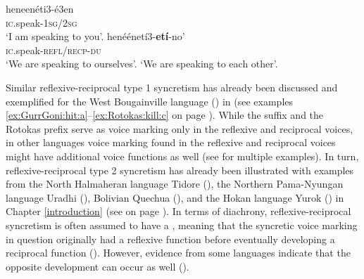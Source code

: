 \ea {} \citep[110, 140]{cowell:moss:2008}
\ea\label{ex:Arapaho:speak:a}
	\gll	heneenéti3-é3en	\\
			\textsc{ic}.speak-\textsc{1sg/2sg} \\
	\glt	‘I am speaking to you’.
\ex\label{ex:Arapaho:speak:b}
	\gll	henéénetí3-\textbf{etí}-no’ \\
			\textsc{ic}.speak-\textsc{refl/recp-du} \\
	\glt	‘We are speaking to ourselves’.
	\glt	‘We are speaking to each other’.
	\z 
\z

Similar reflexive-reciprocal type 1 syncretism has already been discussed and exemplified for the West Bougainville language  () in  (see examples \ref{ex:GurrGoni:hit:a}--\ref{ex:Rotokas:kill:c} on page \pageref{ex:GurrGoni:hit:a}). While the  suffix  and the Rotokas prefix  serve as voice marking only in the reflexive and reciprocal voices, in other languages voice marking found in the reflexive and reciprocal voices might have additional voice functions as well (see  for multiple examples). In turn, reflexive-reciprocal type 2 syncretism has already been illustrated with examples from the North Halmaheran language Tidore (), the Northern Pama-Nyungan language Uradhi (), Bolivian Quechua (), and the Hokan language Yurok () in Chapter \ref{introduction} (see  on page \pageref{tab:ch1:nedjalkov-examples}). In terms of diachrony, reflexive-reciprocal syncretism is often assumed to have a , meaning that the syncretic voice marking in question originally had a reflexive function before eventually developing a reciprocal function (). However, evidence from some languages indicate that the opposite development can occur as well ().


